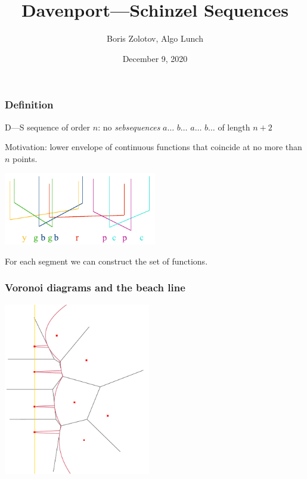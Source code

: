 \documentclass[aspectratio=1610,12pt,notheorems]{beamer}
\title{\bfseries Davenport—Schinzel Sequences}
\author{Boris Zolotov, Algo Lunch}
\institute[\ ]{\ }
\date{December 9, 2020}
\begin{document}
\frame{\titlepage}

\begin{frame} \frametitle{Definition}

\begin{block}{\vspace*{-3ex}}
	D—S sequence of order $n$: no {\it sebsequences} $a \ldots$ $b\ldots$ $a \ldots$ $b\ldots$ of length $n+2$
\end{block}

	Motivation: lower envelope of continuous functions that coincide at no more than $n$ points.

\begin{center}
	\includegraphics[width=0.5\textwidth]{algolunch/ds-segments}
\end{center}

	For each segment we can construct the set of functions. \vspace{1cm}

\end{frame}

\begin{frame} \frametitle{Voronoi diagrams and the beach line}
\begin{center}
	\includegraphics[width=0.48\textwidth]{algolunch/example}
\end{center}
\end{frame}
\end{document}
